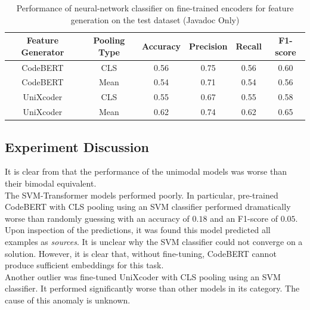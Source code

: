     \begin{table}[H]
        \caption{Performance of neural-network classifier on fine-trained encoders for feature generation on the test dataset (Javadoc Only)}
        \label{tab:test_perfomance_fine_nn_javadoc}
        \begin{center}
            \begin{tabular}{c|c|c|c|c|c}
                \textbf{Feature Generator} & \textbf{Pooling Type} & \textbf{Accuracy} & \textbf{Precision} & \textbf{Recall} & \textbf{F1-score}  \\
                \hline
                CodeBERT & CLS & 0.56 & 0.75 & 0.56 & 0.60 \\
                CodeBERT & Mean & 0.54 & 0.71 & 0.54 & 0.56 \\
                UniXcoder & CLS & 0.55 & 0.67 & 0.55 & 0.58 \\
                UniXcoder & Mean & 0.62 & 0.74 & 0.62 & 0.65 \\
            \end{tabular}
        \end{center}
\end{table}

\subsection{Experiment Discussion}

\noindent
It is clear from  that the performance of the unimodal models was worse than their bimodal equivalent. \\

\noindent
The SVM-Transformer models performed poorly. In particular, pre-trained CodeBERT with CLS pooling using an SVM classifier performed dramatically worse than randomly guessing with an accuracy of $0.18$ and an F1-score of $0.05$. Upon inspection of the predictions, it was found this model predicted all examples as \emph{sources}. It is unclear why the SVM classifier could not converge on a solution. However, it is clear that, without fine-tuning, CodeBERT cannot produce sufficient embeddings for this task. \\

\noindent
Another outlier was fine-tuned UniXcoder with CLS pooling using an SVM classifier. It performed significantly worse than other models in its category. The cause of this anomaly is unknown. \\

